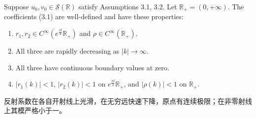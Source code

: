 \begin{papertheoremen}
Suppose $u_0,v_0\in\mathcal S(\mathbb R)$ satisfy Assumptions 3.1, 3.2. Let $\mathbb R_+=(0,+\infty)$. The coefficients (3.1) are well-defined and have these properties:
\begin{enumerate}[label=(\alph*)]
\item $r_1,r_2\in C^\infty(e^{\frac{\pi\ii}{4}}\mathbb R_+)$ and $\rho\in C^\infty(\mathbb R_+)$.
\item All three are rapidly decreasing as $|k|\to\infty$.
\item All three have continuous boundary values at zero.
\item $|r_1(k)|<1$, $|r_2(k)|<1$ on $e^{\frac{\pi\ii}{4}}\mathbb R_+$, and $|\rho(k)|<1$ on $\mathbb R_+$.
\end{enumerate}
\end{papertheoremen}
\begin{papertheoremcn*}
反射系数在各自开射线上光滑，在无穷远快速下降，原点有连续极限；在非零射线上其模严格小于一。
\end{papertheoremcn*}
